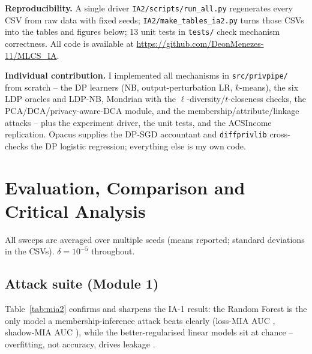 \documentclass[11pt,a4paper]{article}
\begin{document}
\noindent\textbf{Reproducibility.} A single driver
\texttt{IA2/scripts/run\_all.py} regenerates every CSV from raw data with fixed
seeds; \texttt{IA2/make\_tables\_ia2.py} turns those CSVs into the tables and
figures below; 13 unit tests in \texttt{tests/} check mechanism correctness. All code is available
at \url{https://github.com/DeonMenezes-11/MLCS_IA}.

\begin{shaded}\small
\noindent\textbf{Individual contribution.} I implemented all mechanisms in
\texttt{src/privpipe/} from scratch -- the DP learners (NB, output-perturbation
LR, $k$-means), the six LDP oracles and LDP-NB, Mondrian with the
$\ell$-diversity/$t$-closeness checks, the PCA/DCA/privacy-aware-DCA module, and
the membership/attribute/linkage attacks -- plus the experiment driver, the unit
tests, and the ACSIncome replication. Opacus supplies the DP-SGD accountant and
\texttt{diffprivlib} cross-checks the DP logistic regression; everything else is
my own code.
\end{shaded}

\section{Evaluation, Comparison and Critical Analysis}\label{sec:eval2}
All sweeps are averaged over multiple seeds (means reported; standard deviations
in the CSVs). $\delta=10^{-5}$ throughout.

\subsection{Attack suite (Module 1)}
Table~\ref{tab:mia2} confirms and sharpens the IA-1 result: the Random Forest is
the only model a membership-inference attack beats clearly (loss-MIA AUC
\RFlossMIA, shadow-MIA AUC \RFshadowMIA), while the better-regularised linear
models sit at chance -- overfitting, not accuracy, drives leakage
\citep{yeom2018privacy,shokri2017membership}.
\begin{table}[htbp]\centering\caption{Membership inference on each baseline (mean over seeds).}\label{tab:mia2}

\end{table}
\end{document}
